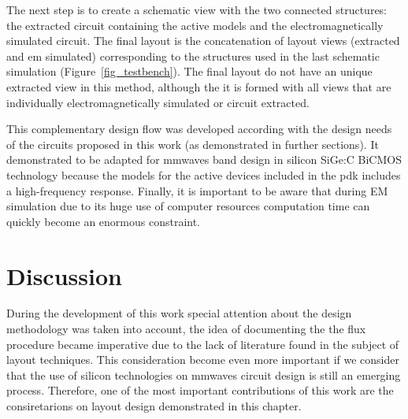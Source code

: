 The next step is to create a schematic view with the two connected structures: 
the extracted circuit containing the active models and the electromagnetically simulated circuit. The final layout is the concatenation of layout views (extracted and \gls{em} simulated) corresponding to the structures used in the last schematic simulation (Figure~\ref{fig_testbench}). The final layout do not have an unique extracted view in this method, although the it is formed with all views that are individually electromagnetically simulated or circuit extracted.

This complementary design flow was developed according with the design needs of the circuits proposed in this work (as demonstrated in further sections). It demonstrated to be adapted for \gls{mmwaves} band design in silicon SiGe:C BiCMOS technology because the models for the active devices included in the \gls{pdk} includes a high-frequency response. Finally, it is important to be aware that during EM simulation due to its huge use of computer resources computation time can quickly become an enormous constraint.

\section{Discussion}
During the development of this work special attention about the design methodology was taken into account, the idea of documenting the the flux procedure became imperative due to the lack of literature found in the subject of layout techniques. This consideration become even more important if we consider that the use of silicon technologies on \gls{mmwaves} circuit design is still an emerging process. Therefore, one of the most important contributions of this work are the consiretarions on layout design demonstrated in this chapter.

